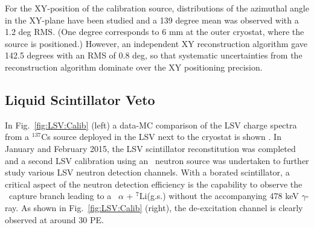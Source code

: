 For the XY-position of the calibration source, distributions of the azimuthal angle in the XY-plane have been studied and a 139 degree mean was observed with a 1.2 deg RMS. (One degree corresponds to 6 mm at the outer cryostat, where the source is positioned.) However, an independent XY reconstruction algorithm gave 142.5 degrees with an RMS of 0.8 deg, so that systematic uncertainties from the reconstruction algorithm dominate over the XY positioning precision. %



\subsection{Liquid Scintillator Veto}\label{sec:LSV:gammasources}

In Fig.~\ref{fig:LSV:Calib} (left) a data-MC comparison of the LSV charge spectra from a $^{137}$Cs source deployed in the LSV next to the cryostat is shown \cite{DS50:G4DS:paper}.
In January and February 2015, the LSV scintillator reconstitution was completed and a second LSV calibration using an \AmBe\ neutron source was undertaken to further study various LSV neutron detection channels. With a borated scintillator, a critical aspect of the neutron detection efficiency is the capability to observe the \brbortenground\ capture branch leading to a \enbortengroundalpha\ $\alpha$ + $^7$Li(g.s.) without the accompanying 478 keV $\gamma$-ray. As shown in Fig.~\ref{fig:LSV:Calib} (right), the de-excitation channel is clearly observed at around 30 PE.

